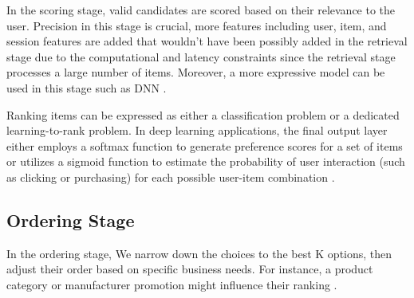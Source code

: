 In the scoring stage, valid candidates are scored based on their relevance to the user. Precision in this stage is crucial, more features including user, item, and session features are added that wouldn't have been possibly added in the retrieval stage due to the computational and latency constraints since the retrieval stage processes a large number of items. Moreover, a more expressive model can be used in this stage such as DNN \cite{eugeneyan}. 

Ranking items can be expressed as either a classification problem or a dedicated learning-to-rank problem. In deep learning applications, the final output layer either employs a softmax function to generate preference scores for a set of items or utilizes a sigmoid function to estimate the probability of user interaction (such as clicking or purchasing) for each possible user-item combination \cite{eugeneyan}. 

\subsection{Ordering Stage}
In the ordering stage, We narrow down the choices to the best K options, then adjust their order based on specific business needs. For instance, a product category or manufacturer promotion might influence their ranking \cite{NvidiaRecSysBestPractices}.
